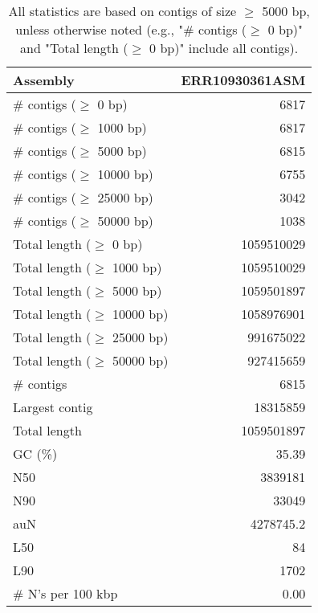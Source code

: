 \documentclass[12pt,a4paper]{article}
\begin{document}
\begin{table}[ht]
\begin{center}
\caption{All statistics are based on contigs of size $\geq$ 5000 bp, unless otherwise noted (e.g., "\# contigs ($\geq$ 0 bp)" and "Total length ($\geq$ 0 bp)" include all contigs).}
\begin{tabular}{|l*{1}{|r}|}
\hline
Assembly & ERR10930361ASM \\ \hline
\# contigs ($\geq$ 0 bp) & 6817 \\ \hline
\# contigs ($\geq$ 1000 bp) & 6817 \\ \hline
\# contigs ($\geq$ 5000 bp) & 6815 \\ \hline
\# contigs ($\geq$ 10000 bp) & 6755 \\ \hline
\# contigs ($\geq$ 25000 bp) & 3042 \\ \hline
\# contigs ($\geq$ 50000 bp) & 1038 \\ \hline
Total length ($\geq$ 0 bp) & 1059510029 \\ \hline
Total length ($\geq$ 1000 bp) & 1059510029 \\ \hline
Total length ($\geq$ 5000 bp) & 1059501897 \\ \hline
Total length ($\geq$ 10000 bp) & 1058976901 \\ \hline
Total length ($\geq$ 25000 bp) & 991675022 \\ \hline
Total length ($\geq$ 50000 bp) & 927415659 \\ \hline
\# contigs & 6815 \\ \hline
Largest contig & 18315859 \\ \hline
Total length & 1059501897 \\ \hline
GC (\%) & 35.39 \\ \hline
N50 & 3839181 \\ \hline
N90 & 33049 \\ \hline
auN & 4278745.2 \\ \hline
L50 & 84 \\ \hline
L90 & 1702 \\ \hline
\# N's per 100 kbp & 0.00 \\ \hline
\end{tabular}
\end{center}
\end{table}
\end{document}
